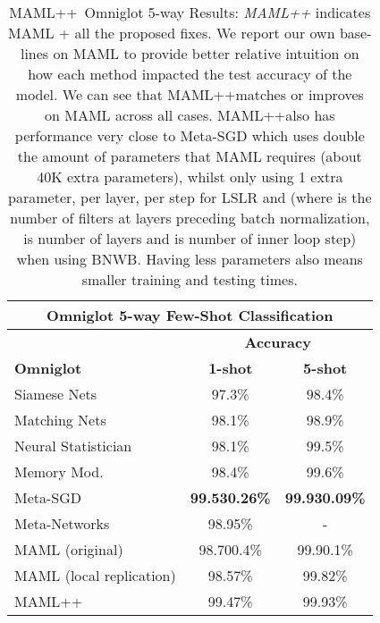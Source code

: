 \documentclass{article} \usepackage[dvipsnames]{xcolor}
\newcommand{\newmaml}{MAML++}
\begin{document}
\begin{table}[tbh]
\centering
\caption{\newmaml\ Omniglot 5-way Results: \emph{\newmaml} indicates MAML + all the proposed fixes. We report our own base-lines on MAML to provide better relative intuition on how each method impacted the test accuracy of the model. We can see that \newmaml matches or improves on MAML across all cases. \newmaml also has performance very close to Meta-SGD which uses double the amount of parameters that MAML requires (about 40K extra parameters), whilst only using 1 extra parameter, per layer, per step for LSLR and  (where  is the number of filters at layers preceding batch normalization,  is number of layers and  is number of inner loop step) when using BNWB. Having less parameters also means smaller training and testing times.}
	\label{table:omniglot2_maml++}
\begin{tabular}{|l|c|c|}
\hline
\multicolumn{3}{|c|}{\textbf{Omniglot 5-way Few-Shot Classification}}                          \\ \hline
                    & \multicolumn{2}{c|}{\textbf{Accuracy}}  \\ \hline
\textbf{Omniglot}   & \textbf{1-shot}    & \textbf{5-shot}    \\ \hline
Siamese Nets        & 97.3\%             & 98.4\%             \\ \hline
Matching Nets       & 98.1\%             & 98.9\%             \\ \hline
Neural Statistician & 98.1\%             & 99.5\%             \\ \hline
Memory Mod.         & 98.4\%             & 99.6\%             \\ \hline
Meta-SGD            & \textbf{99.530.26\%} & \textbf{99.930.09\%} \\ \hline
Meta-Networks       & 98.95\%            & \multicolumn{1}{c|}{-}                \\ \hline
MAML (original)     & 98.700.4\%  & 99.90.1\%   \\ \hline
MAML (local replication)         & 98.57\%            & 99.82\%            \\ \hline
\newmaml            & 99.47\%   & 99.93\%   \\ \hline
\end{tabular}

\end{table}
\end{document}
